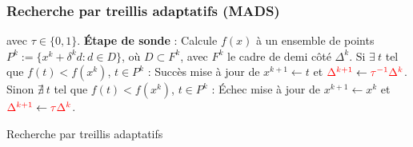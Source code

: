 \documentclass{beamer}
\newcommand\tab[1][1cm]{\hspace*{#1}}
\newcommand{\MADS}{\textsf{MADS}}
\begin{document}
\begin{frame}
\frametitle{Recherche par treillis adaptatifs (\MADS)}
\begin{algorithm}[H]
\begin{algorithmic}[]
\STATE avec $\tau \in \{0,1\}$.
\STATE \textbf{Étape de sonde} : Calcule $f(x)$ à un ensemble de points 
\STATE $P^k:=\{x^k+\delta ^k d:d\in D\}$, où {\color{red}$D\subset F^k$,
\STATE avec $F^k$ le cadre de demi côté $\Delta^k$.}
\STATE
\STATE Si $\exists~t$ tel que $f(t) < f(x^k)$, $t\in P^k$ : Succès
\STATE \tab mise à jour de $x^{k+1}\leftarrow t$ et ${\color{red}\Delta^{k+1}} \leftarrow {\color{red}\tau^{-1}\Delta^k}$.
\STATE
\STATE Sinon $\nexists~t$ tel que $f(t) < f(x^k)$, $t\in P^k$ : Échec
\STATE \tab mise à jour de $x^{k+1}\leftarrow x^k$ et ${\color{red}\Delta^{k+1}} \leftarrow {\color{red}\tau\Delta^k}$.
\ENDFOR
\end{algorithmic}
\caption{Recherche par treillis adaptatifs}
\label{alg:mads}
\end{algorithm}
\end{frame}
\end{document}
